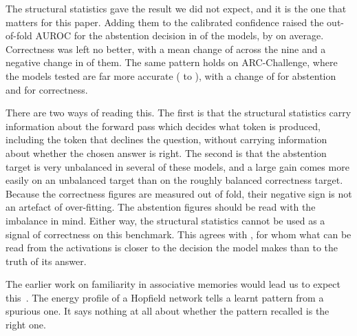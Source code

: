 \documentclass[11pt,a4paper]{article}
\begin{document}
The structural statistics gave the result we did not expect, and it is
the one that matters for this paper.  Adding them to the calibrated
confidence raised the out-of-fold AUROC for the abstention decision in
\readoutNAbstainPositive{} of the \readoutNModels{} models, by
\readoutDAurocAbstainMean{} on average.  Correctness was left no better,
with a mean change of \readoutDAurocCorrectMean{} across the nine and a
negative change in \readoutNCorrectNegative{} of them.  The same pattern
holds on ARC-Challenge, where the \readoutNArcModels{} models tested are
far more accurate (\readoutArcAccMin{} to \readoutArcAccMax{}), with a
change of \readoutArcDAurocAbstainMean{} for abstention and
\readoutArcDAurocCorrectMean{} for correctness.

There are two ways of reading this.  The first is that the structural
statistics carry information about the forward pass which decides what
token is produced, including the token that declines the question, without
carrying information about whether the chosen answer is right.  The second
is that the abstention target is very unbalanced in several of these
models, and a large gain comes more easily on an unbalanced target than on
the roughly balanced correctness target.  Because the correctness figures
are measured out of fold, their negative sign is not an artefact of
over-fitting.  The abstention figures should be read with the imbalance in
mind.  Either way, the structural statistics cannot be used as a signal of
correctness on this benchmark.  This agrees with \citet{kumaran2026causal},
for whom what can be read from the activations is closer to the decision
the model makes than to the truth of its answer.

The earlier work on familiarity in associative memories would lead us to
expect this~\cite{robins2004robust}.  The energy profile of a Hopfield
network tells a learnt pattern from a spurious one.  It says nothing at all
about whether the pattern recalled is the right one.
\end{document}
